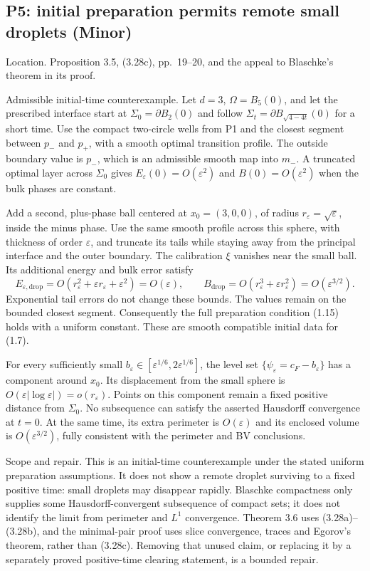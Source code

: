 \documentclass[10pt]{article}
\begin{document}
\subsection*{P5: initial preparation permits remote small droplets (Minor)}
Location. Proposition 3.5, (3.28c), pp. 19–20, and the appeal to Blaschke’s theorem in its proof.\par
Admissible initial-time counterexample. Let \(d=3\), \(\Omega=B_5(0)\), and let the prescribed interface start at \(\Sigma_0=\partial B_2(0)\) and follow \(\Sigma_t=\partial B_{\sqrt{4-4t}}(0)\) for a short time. Use the compact two-circle wells from P1 and the closest segment between \(p_-\) and \(p_+\), with a smooth optimal transition profile. The outside boundary value is \(p_-\), which is an admissible smooth map into \(m_-\). A truncated optimal layer across \(\Sigma_0\) gives \(E_\varepsilon(0)=O(\varepsilon^2)\) and \(B(0)=O(\varepsilon^2)\) when the bulk phases are constant.\par
Add a second, plus-phase ball centered at \(x_0=(3,0,0)\), of radius \(r_\varepsilon=\sqrt\varepsilon\), inside the minus phase. Use the same smooth profile across this sphere, with thickness of order \(\varepsilon\), and truncate its tails while staying away from the principal interface and the outer boundary. The calibration \(\xi\) vanishes near the small ball. Its additional energy and bulk error satisfy \[E_{\varepsilon,\mathrm{drop}}
  =O(r_\varepsilon^2+\varepsilon r_\varepsilon+\varepsilon^2)=O(\varepsilon),\qquad
 B_{\mathrm{drop}}=O(r_\varepsilon^3+\varepsilon r_\varepsilon^2)=O(\varepsilon^{3/2}).\] Exponential tail errors do not change these bounds. The values remain on the bounded closest segment. Consequently the full preparation condition (1.15) holds with a uniform constant. These are smooth compatible initial data for (1.7).\par
For every sufficiently small \(b_\varepsilon\in[\varepsilon^{1/6},2\varepsilon^{1/6}]\), the level set \(\{\psi_\varepsilon=c_F-b_\varepsilon\}\) has a component around \(x_0\). Its displacement from the small sphere is \(O(\varepsilon|\log\varepsilon|)=o(r_\varepsilon)\). Points on this component remain a fixed positive distance from \(\Sigma_0\). No subsequence can satisfy the asserted Hausdorff convergence at \(t=0\). At the same time, its extra perimeter is \(O(\varepsilon)\) and its enclosed volume is \(O(\varepsilon^{3/2})\), fully consistent with the perimeter and BV conclusions.\par
Scope and repair. This is an initial-time counterexample under the stated uniform preparation assumptions. It does not show a remote droplet surviving to a fixed positive time: small droplets may disappear rapidly. Blaschke compactness only supplies some Hausdorff-convergent subsequence of compact sets; it does not identify the limit from perimeter and \(L^1\) convergence. Theorem 3.6 uses (3.28a)–(3.28b), and the minimal-pair proof uses slice convergence, traces and Egorov’s theorem, rather than (3.28c). Removing that unused claim, or replacing it by a separately proved positive-time clearing statement, is a bounded repair.\par
\end{document}
